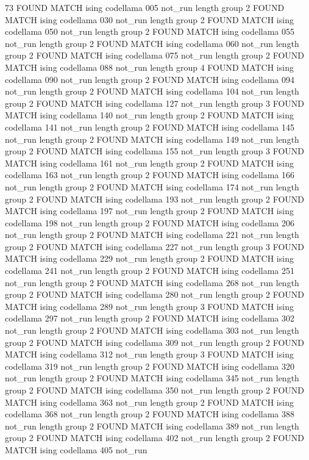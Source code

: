 73
FOUND MATCH ising codellama 005 not_run
length group  2
FOUND MATCH ising codellama 030 not_run
length group  2
FOUND MATCH ising codellama 050 not_run
length group  2
FOUND MATCH ising codellama 055 not_run
length group  2
FOUND MATCH ising codellama 060 not_run
length group  2
FOUND MATCH ising codellama 075 not_run
length group  2
FOUND MATCH ising codellama 088 not_run
length group  4
FOUND MATCH ising codellama 090 not_run
length group  2
FOUND MATCH ising codellama 094 not_run
length group  2
FOUND MATCH ising codellama 104 not_run
length group  2
FOUND MATCH ising codellama 127 not_run
length group  3
FOUND MATCH ising codellama 140 not_run
length group  2
FOUND MATCH ising codellama 141 not_run
length group  2
FOUND MATCH ising codellama 145 not_run
length group  2
FOUND MATCH ising codellama 149 not_run
length group  2
FOUND MATCH ising codellama 155 not_run
length group  3
FOUND MATCH ising codellama 161 not_run
length group  2
FOUND MATCH ising codellama 163 not_run
length group  2
FOUND MATCH ising codellama 166 not_run
length group  2
FOUND MATCH ising codellama 174 not_run
length group  2
FOUND MATCH ising codellama 193 not_run
length group  2
FOUND MATCH ising codellama 197 not_run
length group  2
FOUND MATCH ising codellama 198 not_run
length group  2
FOUND MATCH ising codellama 206 not_run
length group  2
FOUND MATCH ising codellama 221 not_run
length group  2
FOUND MATCH ising codellama 227 not_run
length group  3
FOUND MATCH ising codellama 229 not_run
length group  2
FOUND MATCH ising codellama 241 not_run
length group  2
FOUND MATCH ising codellama 251 not_run
length group  2
FOUND MATCH ising codellama 268 not_run
length group  2
FOUND MATCH ising codellama 280 not_run
length group  2
FOUND MATCH ising codellama 289 not_run
length group  3
FOUND MATCH ising codellama 297 not_run
length group  2
FOUND MATCH ising codellama 302 not_run
length group  2
FOUND MATCH ising codellama 303 not_run
length group  2
FOUND MATCH ising codellama 309 not_run
length group  2
FOUND MATCH ising codellama 312 not_run
length group  3
FOUND MATCH ising codellama 319 not_run
length group  2
FOUND MATCH ising codellama 320 not_run
length group  2
FOUND MATCH ising codellama 345 not_run
length group  2
FOUND MATCH ising codellama 350 not_run
length group  2
FOUND MATCH ising codellama 363 not_run
length group  2
FOUND MATCH ising codellama 368 not_run
length group  2
FOUND MATCH ising codellama 388 not_run
length group  2
FOUND MATCH ising codellama 389 not_run
length group  2
FOUND MATCH ising codellama 402 not_run
length group  2
FOUND MATCH ising codellama 405 not_run
